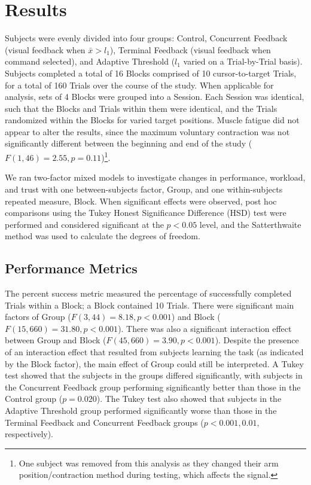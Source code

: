 \section{Results}
Subjects were evenly divided into four groups: Control, Concurrent Feedback (visual feedback when $\bar{x}> l_1$), Terminal Feedback (visual feedback when command selected), and Adaptive Threshold ($l_1$ varied on a Trial-by-Trial basis).
Subjects completed a total of 16 Blocks comprised of 10 cursor-to-target Trials, for a total of 160 Trials over the course of the study.
When applicable for analysis, sets of 4 Blocks were grouped into a Session.
Each Session was identical, such that the Blocks and Trials within them were identical, and the Trials randomized within the Blocks for varied target positions.
Muscle fatigue did not appear to alter the results, since the maximum voluntary contraction was not significantly different between the beginning and end of the study ($F(1, 46) = 2.55, p = 0.11$)\footnote{One subject was removed from this analysis as they changed their arm position/contraction method during testing, which affects the signal.}.

We ran two-factor mixed models to investigate changes in performance, workload, and trust with one between-subjects factor, Group, and one within-subjects repeated measure, Block.
When significant effects were observed, post hoc comparisons using the Tukey Honest Significance Difference (HSD) test were performed and considered significant at the $p < 0.05$ level, and the Satterthwaite method was used to calculate the degrees of freedom.

\subsection{Performance Metrics}
The percent success metric measured the percentage of successfully completed Trials within a Block; a Block contained 10 Trials.
There were significant main factors of Group ($F(3, 44) = 8.18, p < 0.001$) and Block ($F(15, 660) = 31.80, p < 0.001$).
There was also a significant interaction effect between Group and Block ($F(45, 660) = 3.90, p < 0.001$).
Despite the presence of an interaction effect that resulted from subjects learning the task (as indicated by the Block factor), the main effect of Group could still be interpreted.
A Tukey test showed that the subjects in the groups differed significantly, with subjects in the Concurrent Feedback group performing significantly better than those in the Control group ($p = 0.020$).
The Tukey test also showed that subjects in the Adaptive Threshold group performed significantly worse than those in the Terminal Feedback and Concurrent Feedback groups ($p < 0.001, 0.01,$ respectively).

